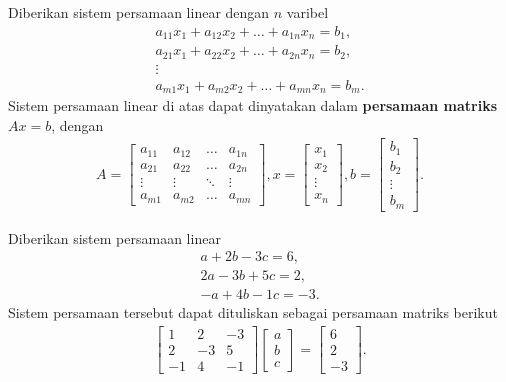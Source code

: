 \begin{definisi}
    Diberikan sistem persamaan linear dengan $n$ varibel
    \begin{gather*}
        a_{11}x_1 + a_{12}x_2 + \dots + a_{1n}x_n =b_1,\\
        a_{21}x_1 + a_{22}x_2 + \dots + a_{2n}x_n =b_2,\\
        \vdots\\
        a_{m1}x_1 + a_{m2}x_2 + \dots + a_{mn}x_n =b_m.
    \end{gather*}
    Sistem persamaan linear di atas dapat dinyatakan dalam \textbf{persamaan matriks $Ax=b$}, dengan
    \begin{align*}
        A=
        \begin{bmatrix}
a_{11} & a_{12} & \dots & a_{1n}\\
a_{21} & a_{22} & \dots & a_{2n}\\
\vdots & \vdots & \ddots & \vdots\\
a_{m1} & a_{m2} & \dots & a_{mn}
\end{bmatrix},
x=\begin{bmatrix}
    x_1\\
    x_2\\
    \vdots\\
    x_n
\end{bmatrix},
b=\begin{bmatrix}
    b_1\\
    b_2\\
    \vdots\\
    b_m
\end{bmatrix}.
    \end{align*}
\end{definisi}
\begin{contoh}
    Diberikan sistem persamaan linear
    \begin{align*}
        a + 2b - 3c = 6,\\
        2a - 3b + 5c = 2,\\
        -a + 4b - 1c = -3.
    \end{align*}
    Sistem persamaan tersebut dapat dituliskan sebagai persamaan matriks berikut
    \begin{align*}
        \begin{bmatrix}
            1&2&-3\\
            2&-3&5\\
            -1&4&-1
        \end{bmatrix}
        \begin{bmatrix}
            a\\
            b\\
            c
        \end{bmatrix}
        =
        \begin{bmatrix}
            6\\
            2\\
            -3
        \end{bmatrix}.
    \end{align*}
\end{contoh}
